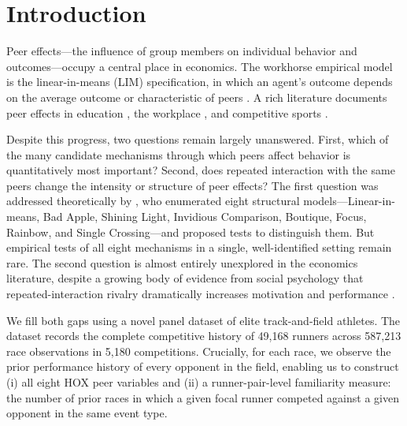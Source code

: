 \documentclass[12pt]{article}
\theoremstyle{definition}
\theoremstyle{remark}
\begin{document}
\begin{titlepage}
\begin{center}
\begin{abstract}
\vspace{0.5cm}
\noindent\textbf{JEL Classification:} J24, Z22, D83, C23

\noindent\textbf{Keywords:} peer effects, rivalry, track and field, familiarity,
task complexity, panel data, fixed effects
\end{abstract}

\end{center}
\end{titlepage}

\clearpage
\section{Introduction}
\label{sec:intro}

Peer effects---the influence of group members on individual behavior and
outcomes---occupy a central place in economics.
The workhorse empirical model is the linear-in-means (LIM) specification,
in which an agent's outcome depends on the average outcome or characteristic
of peers \citep{Manski1993}.
A rich literature documents peer effects in education
\citep{Sacerdote2001,HoxbyWeingarth2007}, the workplace
\citep{MasMoretti2009,FalkIchino2006,CornelissenDustmannSchonberg2017},
and competitive sports \citep{GuryanKroftNotowidigdo2009,Brown2011}.

Despite this progress, two questions remain largely unanswered.
First, which of the many candidate mechanisms through which peers affect
behavior is quantitatively most important?
Second, does repeated interaction with the same peers change the intensity or structure
of peer effects?
The first question was addressed theoretically by \citet{HoxbyWeingarth2007},
who enumerated eight structural models---Linear-in-means, Bad Apple, Shining Light,
Invidious Comparison, Boutique, Focus, Rainbow, and Single Crossing---and proposed
tests to distinguish them.
But empirical tests of all eight mechanisms in a single, well-identified setting
remain rare.
The second question is almost entirely unexplored in the economics literature,
despite a growing body of evidence from social psychology that
repeated-interaction rivalry dramatically increases motivation and performance
\citep{KilduffElfenbeinStaw2010,Kilduff2014}.

We fill both gaps using a novel panel dataset of elite track-and-field athletes.
The dataset records the complete competitive history of 49{,}168 runners across
587{,}213 race observations in 5{,}180 competitions.
Crucially, for each race, we observe the prior performance history of every
opponent in the field, enabling us to construct (i) all eight HOX peer
variables and (ii) a runner-pair-level familiarity measure: the number of prior
races in which a given focal runner competed against a given opponent in the
same event type.
\end{document}
